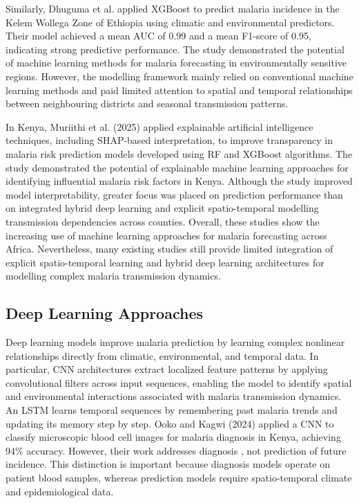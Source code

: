 Similarly, Dhuguma et al. \cite{Dhuguma2025Understanding} applied XGBoost to predict malaria incidence in the Kelem Wollega Zone of Ethiopia using climatic and environmental predictors. Their model achieved a mean AUC of 0.99 and a mean F1-score of 0.95, indicating strong predictive performance. The study demonstrated the potential of machine learning methods for malaria forecasting in environmentally sensitive regions. However, the modelling framework mainly relied on conventional machine learning methods and paid limited attention to spatial and temporal relationships between neighbouring districts and seasonal transmission patterns.

In Kenya, Muriithi et al. (2025) \cite{muriithi2025explainable} applied explainable artificial intelligence techniques, including SHAP-based interpretation, to improve transparency in malaria risk prediction models developed using RF and XGBoost algorithms. The study demonstrated the potential of explainable machine learning approaches for identifying influential malaria risk factors in Kenya. Although the study improved model interpretability, greater focus was placed on prediction performance than on integrated hybrid deep learning and explicit spatio-temporal modelling transmission dependencies across counties. Overall, these studies show the increasing use of machine learning approaches for malaria forecasting across Africa. Nevertheless, many existing studies still provide limited integration of explicit spatio-temporal learning and hybrid deep learning architectures for modelling complex malaria transmission dynamics.


\subsection{Deep Learning Approaches}

Deep learning models improve malaria prediction by learning complex nonlinear relationships directly from climatic, environmental, and temporal data. In particular, CNN architectures extract localized feature patterns by applying convolutional filters across input sequences, enabling the model to identify spatial and environmental interactions associated with malaria transmission dynamics. An LSTM learns temporal sequences by remembering past malaria trends and updating its memory step by step. Ooko and Kagwi (2024)\cite{Ooko2024} applied a CNN to classify microscopic blood cell images for malaria diagnosis in Kenya, achieving 94\% accuracy. However, their work addresses diagnosis , not prediction of future incidence. This distinction is important because diagnosis models operate on patient blood samples, whereas prediction models require spatio-temporal climate and epidemiological data. 

